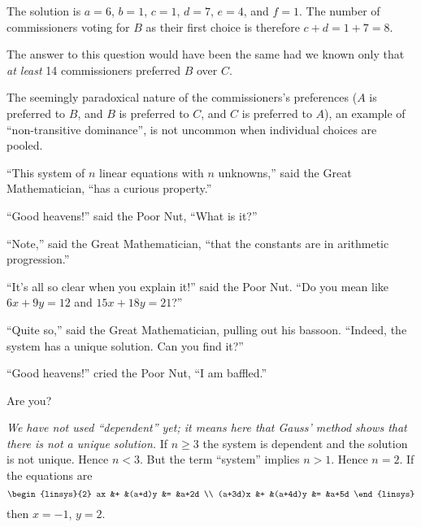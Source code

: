 \begin{exercises}
\begin{answer}
       The solution is $a=6$, $b=1$, $c=1$, $d=7$, $e=4$, and $f=1$.
       The number of commissioners voting for $B$ as their first choice 
       is therefore $c+d=1+7=8$.

       \par{}
       The answer to this question would have been the same had we known only
       that {\em at least\/} 14 commissioners preferred $B$ over $C$.

       The seemingly paradoxical nature of the commissioners's preferences
       ($A$ is preferred to $B$, and $B$ is preferred to $C$, and $C$ is 
       preferred to $A$), an example of ``non-transitive dominance'', is not
       uncommon when individual choices are pooled.
     \end{answer}
  \puzzle \item   
     \cite{Monthly63p93}
    ``This system
     of \( n \) linear equations with
     \( n \) unknowns,'' said the Great Mathematician, ``has a curious
     property.''

     ``Good heavens!'' said the Poor Nut,  ``What is it?''

     ``Note,'' said the Great Mathematician, ``that the constants are in
     arithmetic progression.''

     ``It's all so clear when you explain it!'' said the Poor Nut.
     ``Do you mean like \( 6x+9y=12 \) and \( 15x+18y=21 \)?''

     ``Quite so,'' said the Great Mathematician, pulling out his bassoon.
     ``Indeed, the system has a unique solution.
     Can you find it?''

     ``Good heavens!'' cried the Poor Nut, ``I am baffled.''

     Are you?
     \begin{answer}
       \answerasgiven
       \textit{We have not used ``dependent'' yet; 
       it means here that Gauss'
       method shows that there is not a unique solution.}
       If \( n\geq 3 \) the system is dependent and the solution is not
       unique.
       Hence \( n<3 \).
       But the term ``system'' implies \( n>1 \).
       Hence \( n=2 \).
       If the equations are
       \begin{equation*}
         \begin{linsys}{2}
              ax  &+ &(a+d)y  &=  &a+2d  \\
         (a+3d)x  &+ &(a+4d)y &=  &a+5d  
         \end{linsys}
       \end{equation*}
       then \( x=-1 \), \( y=2 \).  
    \end{answer}
\end{exercises}







